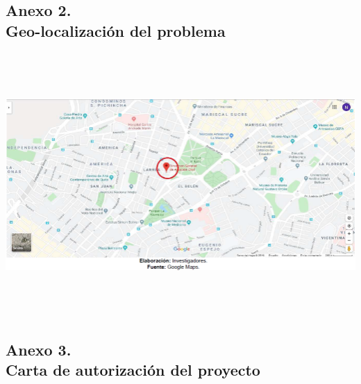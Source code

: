 \documentclass[12pt, a4paper, nofontenc, numbers=endperiod]{apa7}
\begin{document}
{\subsection*{\normalsize \centering Anexo 2. \\ Geo-localización del problema}
\begin{center}
	\includegraphics[width=14cm,height=10cm]{Imagenes/Figura35}
\end{center}
\newpage
\subsection*{\normalsize \centering Anexo 3. \\ Carta de autorización del proyecto}
\newpage
}
\end{document}
